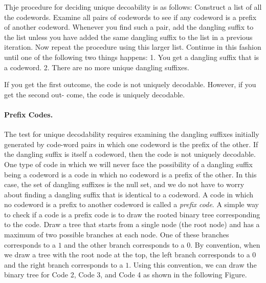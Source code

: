 Thje procedure for deciding unique decoability is as follows: Construct a list of all the codewords. Examine all pairs of codewords to see if any codeword is a prefix of another codeword. Whenever you find such a pair, add the dangling suffix to the list unless you have added the same dangling suffix to the list in a previous iteration. Now repeat the procedure using this larger list. Continue in this fashion until one of the following two things happens: 1. You get a dangling suffix that is a codeword. 2. There are no more unique dangling suffixes.

If you get the first outcome, the code is not uniquely decodable. However, if you get the second out- come, the code is uniquely decodable.

\paragraph{Prefix Codes.} The test for unique decodability requires examining the dangling suffixes initially generated by code-word pairs in which one codeword is the prefix of the other. If the dangling suffix is itself a codeword, then the code is not uniquely decodable. One type of code in which we will never face the possibility of a dangling suffix being a codeword is a code in which no codeword is a prefix of the other. In this case, the set of dangling suffixes is the null set, and we do not have to worry about finding a dangling suffix that is identical to a codeword. A code in which no codeword is a prefix to another codeword is called a \emph{prefix code}. A simple way to check if a code is a prefix code is to draw the rooted binary tree corresponding to the code. Draw a tree that starts from a single node (the root node) and has a maximum of two possible branches at each node. One of these branches corresponds to a $1$ and the other branch corresponds to a $0$. By convention, when we draw a tree with the root node at the top, the left branch corresponds to a $0$ and the right branch corresponds to a $1$. Using this convention, we can draw the binary tree for Code 2, Code 3, and Code 4 as shown in the following Figure.

